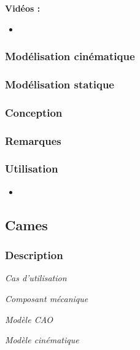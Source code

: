 \documentclass[11pt,oneside]{article}
\begin{document}
\textbf{Vidéos :}
\begin{itemize}
\item
\end{itemize}

\subsubsection{Modélisation cinématique}
\subsubsection{Modélisation statique}
\subsubsection{Conception}
\subsubsection{Remarques}
\subsubsection{Utilisation}
\begin{itemize}
\item
\end{itemize}
\newpage

\subsection{Cames}
\subsubsection{Description}

\begin{center}
\hfill
\begin{minipage}[c]{.21\linewidth}
\begin{center}
\textit{Cas d'utilisation}
\end{center}
\end{minipage} \hfill
\begin{minipage}[c]{.21\linewidth}
\begin{center}
\textit{Composant mécanique}
\end{center}
\end{minipage} \hfill
\begin{minipage}[c]{.21\linewidth}
\begin{center}
\textit{Modèle CAO}
\end{center} 
\end{minipage}\hfill
\begin{minipage}[c]{.21\linewidth}
\begin{center}
\textit{Modèle cinématique}
\end{center} 
\end{minipage}\hfill
\end{center}
\end{document}
